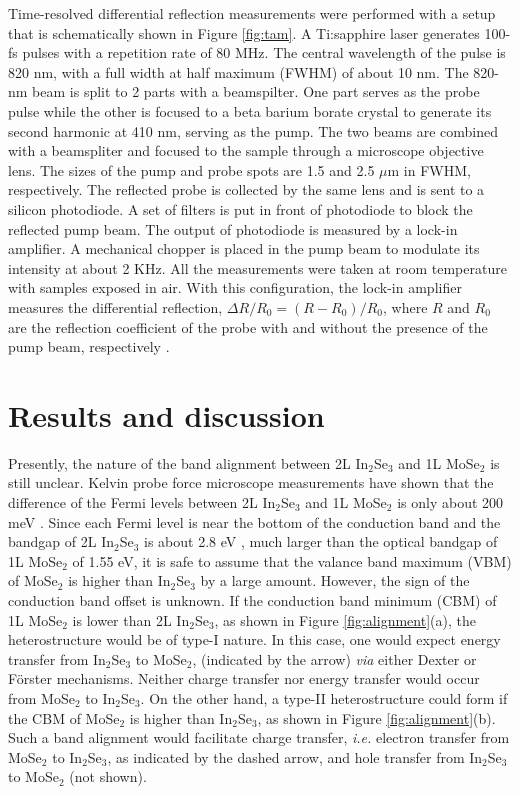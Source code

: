 \documentclass[journal=jacsat,manuscript=article]{achemso}
\begin{document}
Time-resolved differential reflection measurements were performed with a setup that is schematically shown in Figure \ref{fig:tam}. A Ti:sapphire laser generates 100-fs pulses with a repetition rate of 80 MHz. The central wavelength of the pulse is 820 nm, with a full width at half maximum (FWHM) of about 10 nm. The 820-nm beam is split to 2 parts with a beamspilter. One part serves as the probe pulse while the other is focused to a beta barium borate crystal to generate its second harmonic at 410 nm, serving as the pump. The two beams are combined with a beamspliter and focused to the sample through a microscope objective lens. The sizes of the pump and probe spots are 1.5 and 2.5 $\mu$m in FWHM, respectively. The reflected probe is collected by the same lens and is sent to a silicon photodiode. A set of filters is put in front of photodiode to block the reflected pump beam. The output of photodiode is measured by a lock-in amplifier. A mechanical chopper is placed in the pump beam to modulate its intensity at about 2 KHz. All the measurements were taken at room temperature with samples exposed in air. With this configuration, the lock-in amplifier measures the differential reflection, $\Delta R / R_0 = (R - R_0) / R_0$, where $R$ and $R_0$ are the reflection coefficient of the probe with and without the presence of the pump beam, respectively \cite{afm271604509}.
\section{Results and discussion}

Presently, the nature of the band alignment between 2L In$_2$Se$_3$ and 1L MoSe$_2$ is still unclear. Kelvin probe force microscope measurements have shown that the difference of the Fermi levels between 2L In$_2$Se$_3$ and 1L MoSe$_2$ is only about 200 meV \cite{cjcp30325}. Since each Fermi level is near the bottom of the conduction band \cite{2dm4035019} and the bandgap of 2L In$_2$Se$_3$ is about 2.8 eV \cite{aom41939}, much larger than the optical bandgap of 1L MoSe$_2$ of 1.55 eV, it is safe to assume that the valance band maximum (VBM) of MoSe$_2$ is higher than In$_2$Se$_3$ by a large amount. However, the sign of the conduction band offset is unknown. If the conduction band minimum (CBM) of 1L MoSe$_2$ is lower than 2L In$_2$Se$_3$, as shown in Figure \ref{fig:alignment}(a), the heterostructure would be of type-I nature. In this case, one would expect energy transfer from In$_2$Se$_3$ to MoSe$_2$, (indicated by the arrow) {\it via} either Dexter or F{\"o}rster mechanisms. Neither charge transfer nor energy transfer would occur from MoSe$_2$ to In$_2$Se$_3$. On the other hand, a type-II heterostructure could form if the CBM of MoSe$_2$ is higher than In$_2$Se$_3$, as shown in Figure \ref{fig:alignment}(b). Such a band alignment would facilitate charge transfer, {\it i.e.} electron transfer from MoSe$_2$ to In$_2$Se$_3$, as indicated by the dashed arrow,  and hole transfer from In$_2$Se$_3$ to MoSe$_2$ (not shown). 
\end{document}

